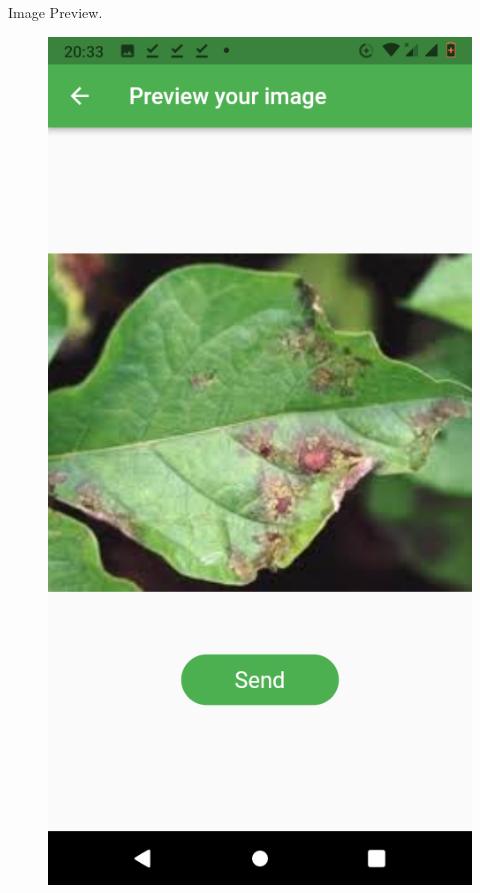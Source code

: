 \documentclass[11pt]{report}
\begin{document}
\newpage
Image Preview.\\
\begin{figure}[h]
	\centerline{\small 
		\includegraphics[height=0.20\textheight]  {preview}}
\end{figure}
\end{document}
